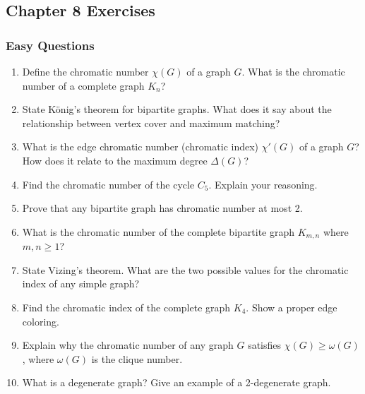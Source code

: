 \documentclass{article}
\theoremstyle{definition}
\begin{document}
\pagebreak
\clearpage
\newpage


\subsection{Chapter 8 Exercises}

\subsubsection{Easy Questions}
\begin{enumerate}
\item Define the chromatic number $\chi(G)$ of a graph $G$. What is the chromatic number of a complete graph $K_n$?

\item State König's theorem for bipartite graphs. What does it say about the relationship between vertex cover and maximum matching?

\item What is the edge chromatic number (chromatic index) $\chi'(G)$ of a graph $G$? How does it relate to the maximum degree $\Delta(G)$?

\item Find the chromatic number of the cycle $C_5$. Explain your reasoning.

\item Prove that any bipartite graph has chromatic number at most 2.

\item What is the chromatic number of the complete bipartite graph $K_{m,n}$ where $m, n \geq 1$?

\item State Vizing's theorem. What are the two possible values for the chromatic index of any simple graph?

\item Find the chromatic index of the complete graph $K_4$. Show a proper edge coloring.

\item Explain why the chromatic number of any graph $G$ satisfies $\chi(G) \geq \omega(G)$, where $\omega(G)$ is the clique number.

\item What is a degenerate graph? Give an example of a 2-degenerate graph.
\end{enumerate}
\end{document}
